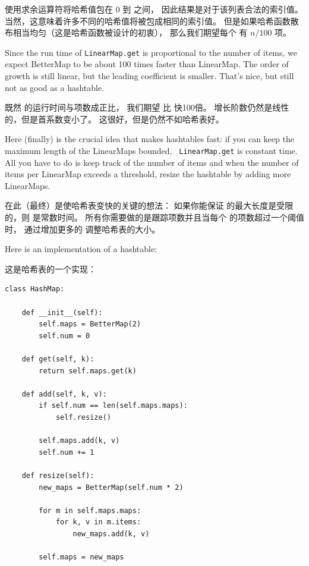  使用求余运算符将哈希值包在 0 到  之间，
因此结果是对于该列表合法的索引值。 当然，这意味着许多不同的哈希值将被包成相同的索引值。 但是如果哈希函数散布相当均匀（这是哈希函数被设计的初衷）， 那么我们期望每个  有 $n/100$ 项。

Since the run time of {\tt LinearMap.get} is proportional to the
number of items, we expect BetterMap to be about 100 times faster
than LinearMap.  The order of growth is still linear, but the
leading coefficient is smaller.  That's nice, but still not
as good as a hashtable.

既然  的运行时间与项数成正比，
我们期望  比  快100倍。
增长阶数仍然是线性的，但是首系数变小了。 这很好，但是仍然不如哈希表好。

Here (finally) is the crucial idea that makes hashtables fast: if you
can keep the maximum length of the LinearMaps bounded, {\tt
  LinearMap.get} is constant time.  All you have to do is keep track
of the number of items and when the number of
items per LinearMap exceeds a threshold, resize the hashtable by
adding more LinearMaps.

在此（最终）是使哈希表变快的关键的想法：
如果你能保证  的最大长度是受限的，则  是常数时间。
所有你需要做的是跟踪项数并且当每个  的项数超过一个阈值时，
通过增加更多的  调整哈希表的大小。

Here is an implementation of a hashtable:

这是哈希表的一个实现：

\begin{lstlisting}
class HashMap:

    def __init__(self):
        self.maps = BetterMap(2)
        self.num = 0

    def get(self, k):
        return self.maps.get(k)

    def add(self, k, v):
        if self.num == len(self.maps.maps):
            self.resize()

        self.maps.add(k, v)
        self.num += 1

    def resize(self):
        new_maps = BetterMap(self.num * 2)

        for m in self.maps.maps:
            for k, v in m.items:
                new_maps.add(k, v)

        self.maps = new_maps
\end{lstlisting}

